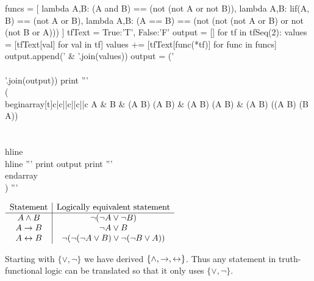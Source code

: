 \item

\begin{python}[truth.py]
funcs = [
    lambda A,B: (A and B) == (not (not A or not B)),
    lambda A,B: lif(A, B) == (not A or B),
    lambda A,B: (A == B) ==  (not (not (not A or B) or not (not B or A)))
]
tfText = {True:'T', False:'F'}
output = []
for tf in tfSeq(2):
    values = [tfText[val] for val in tf]
    values += [tfText[func(*tf)] for func in funcs]
    output.append(' & '.join(values))
output = (' \\\\\n'.join(output))
print '''
\\(
\\begin{array}[t]{c|c||c||c||c}
A & B &
(A \land B) \liff \lnot (\lnot A \lor \lnot B) &
(A \lif B) \liff (\lnot A \lor B) &
(A \liff B) \liff \lnot (\lnot (\lnot A \lor B) \lor \lnot (\lnot B \lor A)) \\\\
\\hline
\\hline
'''
print output
print '''
\\end{array}
\\)
'''
\end{python}

\(
\begin{array}{c|c}
\textrm{Statement} & \textrm{Logically equivalent statement} \\
\hline
A \land B & \lnot (\lnot A \lor \lnot B) \\
A \rightarrow B & \lnot A \lor B \\
A \leftrightarrow B & \lnot (\lnot (\lnot A \lor B) \lor \lnot (\lnot B \lor A)) \\
\end{array}
\)

Starting with $\{ \lor, \lnot \}$ we have derived $\{ \land, \rightarrow, \leftrightarrow \}$. Thus any statement in truth-functional logic can be translated so that it only uses $\{ \lor, \lnot \}$.

